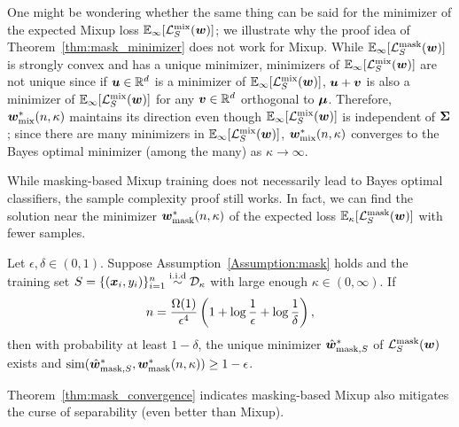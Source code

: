 One might be wondering whether the same thing can be said for the minimizer of the expected Mixup loss $\mathbb{E}_\infty[\mathcal{L}_S^\mathrm{mix} ({\bm{w}})]$; we illustrate why the proof idea of Theorem~\ref{thm:mask_minimizer} does not work for Mixup. While $\mathbb{E}_\infty[\mathcal{L}_S^\mathrm{mask} ({\bm{w}})]$ is strongly convex and has a unique minimizer, minimizers of $\mathbb{E}_\infty[\mathcal{L}_S^\mathrm{mix} ({\bm{w}})]$ are not unique since if ${\bm{u}} \in \mathbb{R}^d$ is a minimizer of  $\mathbb{E}_\infty[\mathcal{L}_S^\mathrm{mix} ({\bm{w}})]$, ${\bm{u}}+{\bm{v}}$ is also a minimizer of $\mathbb{E}_\infty[\mathcal{L}_S^\mathrm{mix} ({\bm{w}})]$ for any ${\bm{v}} \in \mathbb{R}^d$ orthogonal to ${\bm{\mu}}$. 
Therefore, ${\bm{w}}^*_\mathrm{mix}(n,\kappa)$ maintains its direction even though $\mathbb{E}_\infty[\mathcal{L}_S^\mathrm{mix} ({\bm{w}})]$ is independent of ${\bm{\Sigma}}$; since there are many minimizers in $\mathbb{E}_\infty[\mathcal{L}_S^\mathrm{mix} ({\bm{w}})]$, ${\bm{w}}^*_\mathrm{mix}(n,\kappa)$ converges to the Bayes optimal minimizer (among the many) as $\kappa \to \infty$.

While masking-based Mixup training does not necessarily lead to Bayes optimal classifiers, the sample complexity proof still works. In fact, we can find the solution near the minimizer ${\bm{w}}^*_\mathrm{mask}(n,\kappa)$ of the expected loss $\mathbb{E}_{\kappa}[\mathcal{L}_S^\mathrm{mask}({\bm{w}})]$ with fewer samples.
\begin{theorem}\label{thm:mask_convergence}
Let $\epsilon, \delta \in (0,1)$. Suppose Assumption~\ref{Assumption:mask} holds and the training set $S = \{({\bm{x}}_i, y_i)\}_{i=1}^n\overset{\mathrm{i.i.d}}{\sim} \mathcal{D}_\kappa$ with large enough $\kappa \in (0,\infty)$.
If 
\begin{equation*}
    n = \frac{\Omega(1)}{\epsilon^4} \left (1+ \log \frac{1}{\epsilon} + \log \frac{1}{\delta} \right ),
    \vspace{-5pt}
\end{equation*}
then with probability at least $1-\delta$, the unique minimizer $\hat{{\bm{w}}}_{\mathrm{mask}, S}^*$ of $\mathcal{L}_S^\mathrm{mask}({\bm{w}})$ exists and $\mathrm{sim}(\hat{{\bm{w}}}_{\mathrm{mask}, S}^*, {\bm{w}}^*_\mathrm{mask}(n,\kappa)) \geq 1-\epsilon$. 
\end{theorem} 
Theorem~\ref{thm:mask_convergence} indicates masking-based Mixup also mitigates the curse of separability (even better than Mixup).
